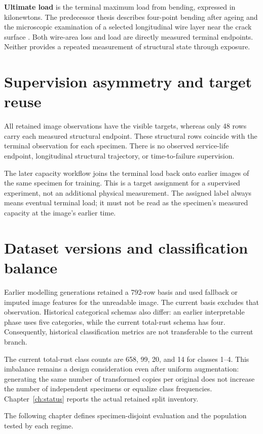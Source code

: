 \textbf{Ultimate load} is the terminal maximum load from bending, expressed in kilonewtons. The predecessor thesis describes four-point bending after ageing and the microscopic examination of a selected longitudinal wire layer near the crack surface \citep[secs.~4.2.2.3, 4.2.3, and 5.2.1]{hossain_thesis}. Both wire-area loss and load are directly measured terminal endpoints. Neither provides a repeated measurement of structural state through exposure.

\section{Supervision asymmetry and target reuse}
All retained image observations have the visible targets, whereas only 48 rows carry each measured structural endpoint. These structural rows coincide with the terminal observation for each specimen. There is no observed service-life endpoint, longitudinal structural trajectory, or time-to-failure supervision.

The later capacity workflow joins the terminal load back onto earlier images of the same specimen for training. This is a target assignment for a supervised experiment, not an additional physical measurement. The assigned label always means eventual terminal load; it must not be read as the specimen's measured capacity at the image's earlier time.

\section{Dataset versions and classification balance}
Earlier modelling generations retained a 792-row basis and used fallback or imputed image features for the unreadable image. The current basis excludes that observation. Historical categorical schemas also differ: an earlier interpretable phase uses five categories, while the current total-rust schema has four. Consequently, historical classification metrics are not transferable to the current branch.

The current total-rust class counts are 658, 99, 20, and 14 for classes 1--4. This imbalance remains a design consideration even after uniform augmentation: generating the same number of transformed copies per original does not increase the number of independent specimens or equalize class frequencies. Chapter~\ref{ch:status} reports the actual retained split inventory.

The following chapter defines specimen-disjoint evaluation and the population tested by each regime.
